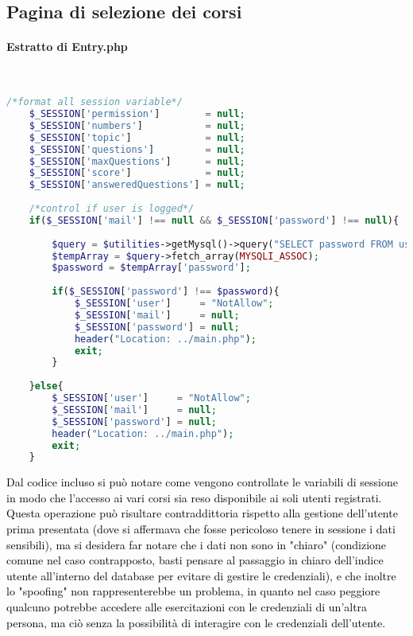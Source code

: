 
\subsection{Pagina di selezione dei corsi}

\paragraph{Estratto di Entry.php}\leavevmode\\

\raggedright
\begin{lstlisting}[language=php]
	/*format all session variable*/
	$_SESSION['permission']        = null;
	$_SESSION['numbers']           = null;
	$_SESSION['topic']             = null;
	$_SESSION['questions']         = null;
	$_SESSION['maxQuestions']      = null;
	$_SESSION['score']             = null;
	$_SESSION['answeredQuestions'] = null;
	
	/*control if user is logged*/
	if($_SESSION['mail'] !== null && $_SESSION['password'] !== null){
		
		$query = $utilities->getMysql()->query("SELECT password FROM user_table1 WHERE (email = '{$_SESSION['mail']}')");
		$tempArray = $query->fetch_array(MYSQLI_ASSOC);
		$password = $tempArray['password'];
		
		if($_SESSION['password'] !== $password){
			$_SESSION['user']     = "NotAllow";
			$_SESSION['mail']     = null;
			$_SESSION['password'] = null;
			header("Location: ../main.php");
			exit;
		}
		
	}else{
		$_SESSION['user']     = "NotAllow";
		$_SESSION['mail']     = null;
		$_SESSION['password'] = null;
		header("Location: ../main.php");
		exit;
	}
\end{lstlisting}

\textcolor{black}{Dal codice incluso si può notare come vengono controllate le variabili di sessione in modo che l'accesso ai vari corsi sia reso disponibile ai soli utenti registrati. Questa operazione può risultare contraddittoria rispetto alla gestione dell'utente prima presentata (dove si affermava che fosse pericoloso tenere in sessione i dati sensibili), ma si desidera far notare che i dati non sono in "chiaro" (condizione comune nel caso contrapposto, basti pensare al passaggio in chiaro dell'indice utente all'interno del database per evitare di gestire le credenziali), e che inoltre lo "spoofing" non rappresenterebbe un problema, in quanto nel caso peggiore qualcuno potrebbe accedere alle esercitazioni con le  credenziali di un'altra persona, ma ciò senza la possibilità di interagire con le credenziali dell'utente.}\\

